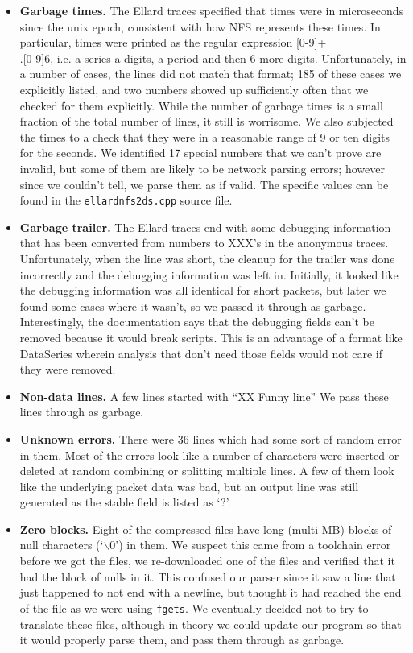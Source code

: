 \begin{itemize}
\item {\bf Garbage times.} The Ellard traces specified that times were
in microseconds since the unix epoch, consistent with how NFS
represents these times.  In particular, times were printed as the
regular expression [0-9]+\\.[0-9]{6}, i.e. a series a digits, a period
and then 6 more digits.  Unfortunately, in a number of cases, the
lines did not match that format; 185 of these cases we explicitly
listed, and two numbers showed up sufficiently often that we checked
for them explicitly.  While the number of garbage times is a small
fraction of the total number of lines, it still is worrisome.  We also
subjected the times to a check that they were in a reasonable range of
9 or ten digits for the seconds.  We identified 17 special numbers
that we can't prove are invalid, but some of them are likely to be
network parsing errors; however since we couldn't tell, we parse them
as if valid.  The specific values can be found in the
\texttt{ellardnfs2ds.cpp} source file.

\item {\bf Garbage trailer.}  The Ellard traces end with some
debugging information that has been converted from numbers to XXX's in
the anonymous traces.  Unfortunately, when the line was short, the
cleanup for the trailer was done incorrectly and the debugging
information was left in.  Initially, it looked like the debugging
information was all identical for short packets, but later we found
some cases where it wasn't, so we passed it through as garbage.
Interestingly, the documentation says that the debugging fields can't
be removed because it would break scripts.  This is an advantage of a
format like DataSeries wherein analysis that don't need those fields
would not care if they were removed.

\item {\bf Non-data lines.}  A few lines started with ``XX Funny
line'' We pass these lines through as garbage.

\item {\bf Unknown errors.} There were 36 lines which had some sort of
random error in them.  Most of the errors look like a number of
characters were inserted or deleted at random combining or splitting
multiple lines.  A few of them look like the underlying packet data
was bad, but an output line was still generated as the stable field is
listed as `?'.

\item {\bf Zero blocks.} Eight of the compressed files have long
(multi-MB) blocks of null characters (`$\backslash0$') in them.  We
suspect this came from a toolchain error before we got the files, we
re-downloaded one of the files and verified that it had the block of
nulls in it.  This confused our parser since it saw a line that just
happened to not end with a newline, but thought it had reached the end
of the file as we were using \texttt{fgets}.  We eventually decided
not to try to translate these files, although in theory we could
update our program so that it would properly parse them, and pass them
through as garbage.


\end{itemize}
